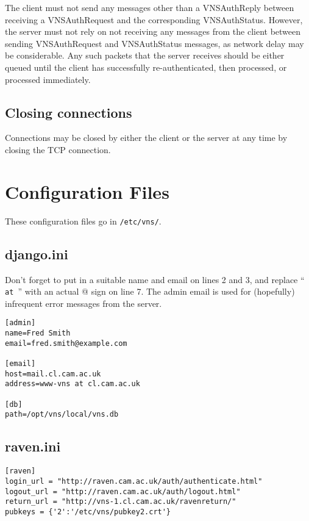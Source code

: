 \documentclass[a4paper,12pt]{report}
\begin{document}
The client must not send any messages other than a VNSAuthReply between receiving a VNSAuthRequest and the corresponding VNSAuthStatus.  However, the server must not rely on not receiving any messages from the client between sending VNSAuthRequest and VNSAuthStatus messages, as network delay may be considerable.  Any such packets that the server receives should be either queued until the client has successfully re-authenticated, then processed, or processed immediately.

\section{Closing connections}
Connections may be closed by either the client or the server at any time by closing the TCP connection.

\appendix
\chapter{Configuration Files}
These configuration files go in \texttt{/etc/vns/}.

\section{django.ini}
Don't forget to put in a suitable name and email on lines 2 and 3, and replace ``\texttt{ at }'' with an actual @ sign on line 7.  The admin email is used for (hopefully) infrequent error messages from the server.

\begin{verbatim}
[admin]
name=Fred Smith
email=fred.smith@example.com

[email]
host=mail.cl.cam.ac.uk
address=www-vns at cl.cam.ac.uk

[db]
path=/opt/vns/local/vns.db
\end{verbatim}

\section{raven.ini}
\begin{verbatim}
[raven]
login_url = "http://raven.cam.ac.uk/auth/authenticate.html"
logout_url = "http://raven.cam.ac.uk/auth/logout.html"
return_url = "http://vns-1.cl.cam.ac.uk/ravenreturn/"
pubkeys = {'2':'/etc/vns/pubkey2.crt'}
\end{verbatim}
\end{document}
